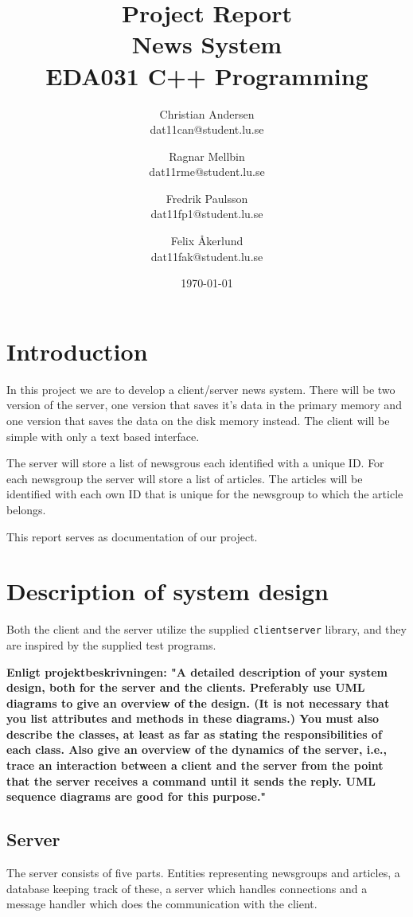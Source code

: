 \documentclass[a4paper]{article}
\title{Project Report \\ News System  \\ EDA031 C++ Programming}
\date{\today}
\author{Christian Andersen \\ dat11can@student.lu.se \and Ragnar Mellbin \\ dat11rme@student.lu.se \and Fredrik Paulsson \\ dat11fp1@student.lu.se
\and Felix \AA kerlund \\ dat11fak@student.lu.se}
\begin{document}
\clearpage\maketitle
\thispagestyle{empty}
\newpage


\section{Introduction}
In this project we are to develop a client/server news system. There will be two version of the server, one version that saves it's data in the primary memory and one version that saves the data on the disk memory instead. The client will be simple with only a text based interface.

The server will store a list of newsgrous each identified with a unique ID. For each newsgroup the server will store a list of articles. The articles will be identified with each own ID that is unique for the newsgroup to which the article belongs.

This report serves as documentation of our project.

\section{Description of system design}
Both the client and the server utilize the supplied \texttt{clientserver} library, and they are inspired by the supplied test programs.

\textbf{Enligt projektbeskrivningen: "A detailed description of your system design, both for the server and the clients. Preferably
use UML diagrams to give an overview of the design. (It is not necessary that you list
attributes and methods in these diagrams.) You must also describe the classes, at least as
far as stating the responsibilities of each class. Also give an overview of the dynamics of the server, i.e., trace an interaction between a
client and the server from the point that the server receives a command until it sends the
reply. UML sequence diagrams are good for this purpose."}

\subsection{Server}

The server consists of five parts. Entities representing newsgroups and articles, a database keeping track of these, a server which handles connections and a message handler which does the communication with the client.
\end{document}
